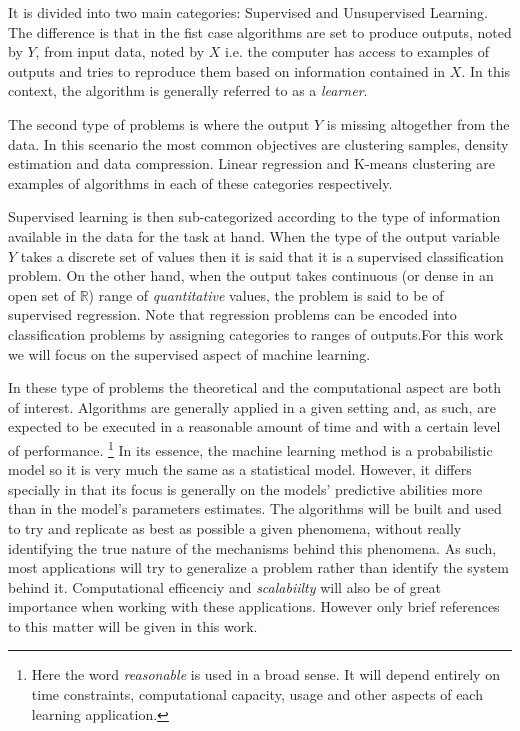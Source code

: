 It is divided into two main categories: Supervised and Unsupervised Learning. The difference is that in the fist case algorithms are set to produce outputs, noted by $Y$, from input data, noted by $X$ i.e. the computer has access to examples of outputs and tries to reproduce them based on information contained in $X$. In this context, the algorithm is generally referred to as a \textit{learner}.

The second type of problems is where the output $Y$ is missing altogether from the data. In this scenario the most common objectives are clustering samples, density estimation and data compression. Linear regression and K-means clustering are examples of algorithms in each of these categories respectively.

Supervised learning is then sub-categorized according to the type of information available in the data for the task at hand. When the type of the output variable $Y$ takes a discrete set of values then it is said that it is a supervised classification problem. On the other hand, when the output takes continuous (or dense in an open set of $\mathbb{R}$) range of \textit{quantitative} values, the problem is said to be of supervised regression. Note that regression problems can be encoded into classification problems by assigning categories to ranges of outputs.For this work we will focus on the supervised aspect of machine learning.

In these type of problems the theoretical and the computational aspect are both of interest. Algorithms are generally applied in a given setting and, as such, are expected to be executed in a reasonable amount of time and with a certain level of performance. \footnote{Here the word \textit{reasonable} is used in a broad sense. It will depend entirely on time constraints, computational capacity, usage and other aspects of each learning application.} In its essence, the machine learning method is a probabilistic model so it is very much the same as a statistical model. However, it differs specially in that its focus is generally on the models' predictive abilities more than in the model's parameters estimates.\cite{breiman-statisticalmodeling} The algorithms will be built and used to try and replicate as best as possible a given phenomena, without really identifying the true nature of the mechanisms behind this phenomena. As such, most applications will try to generalize a problem rather than identify the system behind it. Computational efficenciy and \textit{scalabiilty} will also be of great importance when working with these applications. However only brief references to this matter will be given in this work.

